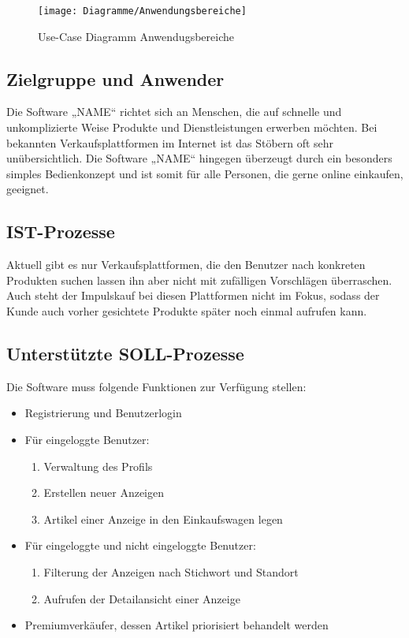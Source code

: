 \documentclass[a4paper,12pt,oneside]{scrartcl}
\begin{document}
\begin{figure}[!htbp]
\centering
\noindent\texttt{[image: Diagramme/Anwendungsbereiche]}
\caption{Use-Case Diagramm Anwendugsbereiche}
\end{figure}
\FloatBarrier


\subsection{Zielgruppe und Anwender}
Die Software „NAME“ richtet sich an Menschen, die auf schnelle und unkomplizierte Weise Produkte und Dienstleistungen erwerben möchten. Bei bekannten Verkaufsplattformen im Internet ist das Stöbern oft sehr unübersichtlich. Die Software „NAME“ hingegen überzeugt durch ein besonders simples Bedienkonzept und ist somit für alle Personen, die gerne online einkaufen, geeignet.


\subsection{IST-Prozesse}
Aktuell gibt es nur Verkaufsplattformen, die den Benutzer nach konkreten Produkten suchen lassen ihn aber nicht mit zufälligen Vorschlägen überraschen. Auch steht der Impulskauf bei diesen Plattformen nicht im Fokus, sodass der Kunde auch vorher gesichtete Produkte später noch einmal aufrufen kann. 


\subsection{Unterstützte SOLL-Prozesse}
Die Software muss folgende Funktionen zur Verfügung stellen:
\begin{itemize}
	\item Registrierung und Benutzerlogin
	\item Für eingeloggte Benutzer:
	\begin{enumerate}
		\item Verwaltung des Profils
		\item Erstellen neuer Anzeigen
		\item Artikel einer Anzeige in den Einkaufswagen legen
	\end{enumerate}
	\item Für eingeloggte und nicht eingeloggte Benutzer:
	\begin{enumerate}
		\item Filterung der Anzeigen nach Stichwort und Standort
		\item Aufrufen der Detailansicht einer Anzeige
	\end{enumerate}
	\item Premiumverkäufer, dessen Artikel priorisiert behandelt werden
\end{itemize}
\end{document}
